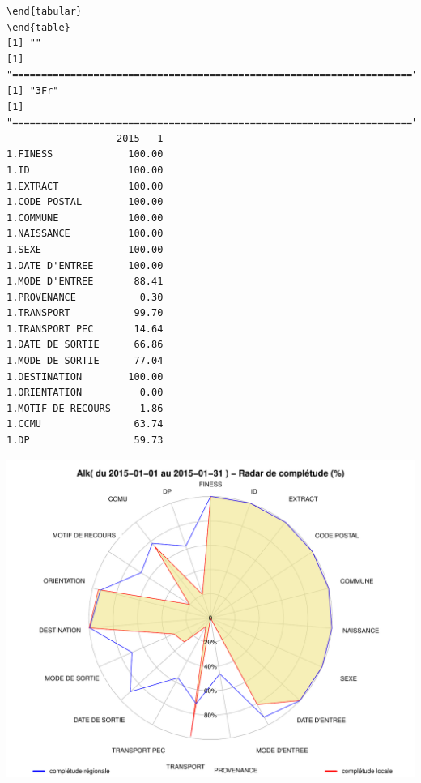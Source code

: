 \documentclass[]{article}
\begin{document}
\begin{verbatim}
\end{tabular} 
\end{table} 
[1] ""
[1] "====================================================================="
[1] "3Fr"
[1] "====================================================================="
                   2015 - 1
1.FINESS             100.00
1.ID                 100.00
1.EXTRACT            100.00
1.CODE POSTAL        100.00
1.COMMUNE            100.00
1.NAISSANCE          100.00
1.SEXE               100.00
1.DATE D'ENTREE      100.00
1.MODE D'ENTREE       88.41
1.PROVENANCE           0.30
1.TRANSPORT           99.70
1.TRANSPORT PEC       14.64
1.DATE DE SORTIE      66.86
1.MODE DE SORTIE      77.04
1.DESTINATION        100.00
1.ORIENTATION          0.00
1.MOTIF DE RECOURS     1.86
1.CCMU                63.74
1.DP                  59.73
\end{verbatim}

\includegraphics{completude_files/figure-latex/finess-8.pdf}
\end{document}
